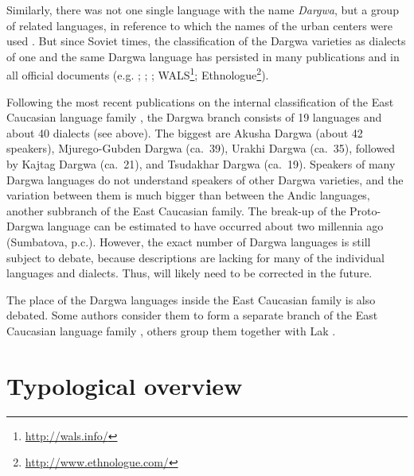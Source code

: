 Similarly, there was not one single language with the name \textit{Dargwa}, but a group of related languages, in reference to which the names of the urban centers were used \citep[1]{Uslar1892}. But since Soviet times, the classification of the Dargwa varieties as dialects of one and the same Dargwa language has persisted in many publications and in all official documents (e.g. ; ; ; WALS\footnote{\url{http://wals.info/}}; Ethnologue\footnote{\url{http://www.ethnologue.com/}}).

Following the most recent publications on the internal classification of the East Caucasian language family \citep{Korjakov2006; Korjakov.Sumbatova2007}, the Dargwa branch consists of 19 languages and about 40 dialects (see  above). The biggest are Akusha Dargwa (about 42 speakers), Mjurego-Gubden Dargwa (ca.~39), Urakhi Dargwa (ca.~35), followed by Kajtag Dargwa (ca.~21), and Tsudakhar Dargwa (ca.~19). Speakers of many Dargwa languages do not understand speakers of other Dargwa varieties, and the variation between them is much bigger than between the Andic languages, another subbranch of the East Caucasian family. The break-up of the Proto-Dargwa language can be estimated to have occurred about two millennia ago (Sumbatova, p.c.). However, the exact number of Dargwa languages is still subject to debate, because descriptions are lacking for many of the individual languages and dialects. Thus,  will likely need to be corrected in the future.

The place of the Dargwa languages inside the East Caucasian family is also debated. Some authors consider them to form a separate branch of the East Caucasian language family \citep[142]{Gigineishvili1977, Kibrik1996}, others group them together with Lak \citep{Haspelmath1993, Korjakov2006, vandenBerg2005}.



\section{Typological overview}
\label{sec:Typological overview}

